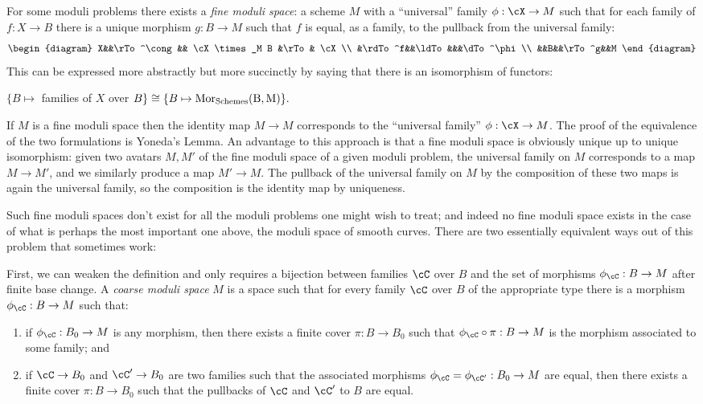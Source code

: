 For some moduli problems there exists a \emph{fine moduli space}: a scheme $M$ with a ``universal'' family $\phi: \cX\to M$ such that for each family of $f: X\to B$
there is a unique morphism $g: B\to M$ such that $f$ is equal, as a family, to the pullback from the universal family:
$$
\begin{diagram}
 X&&\rTo^\cong && \cX \times_M B &\rTo& \cX\\
 &\rdTo^f&&\ldTo&&&\dTo^\phi\\
 &&B&&\rTo^g&&M
\end{diagram}
$$
This can be expressed more abstractly but more succinctly by saying that there is an isomorphism of functors:

\centerline{
$\{ B \mapsto$ families of $X$ over $B \} \cong \{ B\mapsto \rm{Mor}_{\rm Schemes}(B, M) \}.$
}

If $M$ is a fine moduli space then the identity map $M\to M$ corresponds to the ``universal family'' $\phi: \cX \to M$. The proof of the equivalence of the two formulations is Yoneda's Lemma. An advantage to this approach is that a fine moduli space
is obviously unique up to unique isomorphism: given two avatars $M,M'$ of the fine moduli space of a given moduli problem,
the universal family on $M$ corresponds to a map $M\to M'$, and we similarly produce a map $M'\to M$. The pullback of the universal family on $M$ by the composition of these two maps is again the universal family, so the composition is the identity map by uniqueness.

Such fine moduli spaces don't exist for all the moduli problems one might wish to treat; and indeed no fine
moduli space exists in the case of what is perhaps the most important one above, the moduli space of
smooth curves.  There are two essentially equivalent ways out of this problem that sometimes work:

First, we can weaken the definition and only requires a bijection between families $\cC$ over $B$ and the set of morphisms $\phi_\cC : B \to M$ after finite base change. A \emph{coarse moduli space} $M$ is a space such that for every family  $\cC$ over $B$ 
of the appropriate type there is a morphism $\phi_\cC : B \to M$ such that:

\begin{enumerate}
\item if $\phi_\cC : B_0 \to M$ is any morphism, then there exists a finite cover $\pi : B \to B_0$ such that $\phi_\cC \circ \pi : B \to M$ is the morphism associated to some family; and
\item if $\cC \to B_0$ and $\cC' \to B_0$ are two families such that the associated morphisms $\phi_\cC = \phi_{\cC'} : B_0 \to M$ are equal, then there exists a finite cover $\pi : B \to B_0$ such that the pullbacks of $\cC$ and $\cC'$ to $B$ are equal.
\end{enumerate}

